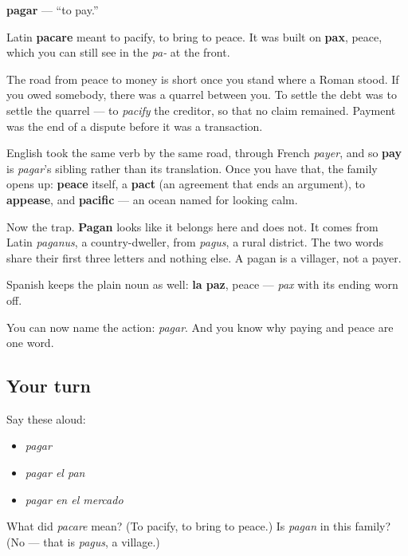 \begin{cousinweb}
\textbf{pagar} — \textquotedblleft{}to pay.\textquotedblright{}

Latin \textbf{pacare} meant to pacify, to bring to peace. It was built on \textbf{pax}, peace, which you can still see in the \emph{pa-} at the front.

The road from peace to money is short once you stand where a Roman stood. If you owed somebody, there was a quarrel between you. To settle the debt was to settle the quarrel — to \emph{pacify} the creditor, so that no claim remained. Payment was the end of a dispute before it was a transaction.

English took the same verb by the same road, through French \emph{payer}, and so \textbf{pay} is \emph{pagar}'s sibling rather than its translation. Once you have that, the family opens up: \textbf{peace} itself, a \textbf{pact} (an agreement that ends an argument), to \textbf{appease}, and \textbf{pacific} — an ocean named for looking calm.

Now the trap. \textbf{Pagan} looks like it belongs here and does not. It comes from Latin \emph{paganus}, a country-dweller, from \emph{pagus}, a rural district. The two words share their first three letters and nothing else. A pagan is a villager, not a payer.

Spanish keeps the plain noun as well: \textbf{la paz}, peace — \emph{pax} with its ending worn off.
\end{cousinweb}

\begin{grammarlens}[title={What you've built}]
You can now name the action: \emph{pagar}. And you know why paying and peace are one word.
\end{grammarlens}

\subsection*{Your turn}
Say these aloud:

\begin{itemize}
\raggedright
  \item \emph{pagar}
  \item \emph{pagar el pan}
  \item \emph{pagar en el mercado}
\end{itemize}

\begin{tcolorbox}[breakable,colback=teal!4,colframe=teal!35!black,title={Before you move on}]
What did \emph{pacare} mean? (To pacify, to bring to peace.) Is \emph{pagan} in this family? (No — that is \emph{pagus}, a village.)
\end{tcolorbox}
